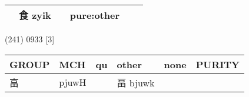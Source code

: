 \documentclass[14pt,a4paper]{scrartcl}
\begin{document}
\begin{longtable}[c]{@{}llllll@{}}
\begin{minipage}[t]{0.14\columnwidth}
\strut\end{minipage} &
\begin{minipage}[t]{0.14\columnwidth}\raggedright\strut
食 zyik
\strut\end{minipage} &
\begin{minipage}[t]{0.14\columnwidth}\raggedright\strut
\strut\end{minipage} &
\begin{minipage}[t]{0.14\columnwidth}\raggedright\strut
pure:other
\strut\end{minipage}\tabularnewline
\bottomrule
\end{longtable}

(241) 0933 {[}3{]}

\begin{longtable}[c]{@{}llllll@{}}
\toprule
\begin{minipage}[b]{0.14\columnwidth}\raggedright\strut
GROUP
\strut\end{minipage} &
\begin{minipage}[b]{0.14\columnwidth}\raggedright\strut
MCH
\strut\end{minipage} &
\begin{minipage}[b]{0.14\columnwidth}\raggedright\strut
qu
\strut\end{minipage} &
\begin{minipage}[b]{0.14\columnwidth}\raggedright\strut
other
\strut\end{minipage} &
\begin{minipage}[b]{0.14\columnwidth}\raggedright\strut
none
\strut\end{minipage} &
\begin{minipage}[b]{0.14\columnwidth}\raggedright\strut
PURITY
\strut\end{minipage}\tabularnewline
\midrule
\endhead
\begin{minipage}[t]{0.14\columnwidth}\raggedright\strut
畗
\strut\end{minipage} &
\begin{minipage}[t]{0.14\columnwidth}\raggedright\strut
pjuwH
\strut\end{minipage} &
\begin{minipage}[t]{0.14\columnwidth}\raggedright\strut
\strut\end{minipage} &
\begin{minipage}[t]{0.14\columnwidth}\raggedright\strut
畐 bjuwk
\strut\end{minipage} &
\begin{minipage}[t]{0.14\columnwidth}\raggedright\strut
\strut\end{minipage} &

\end{longtable}
\end{document}

